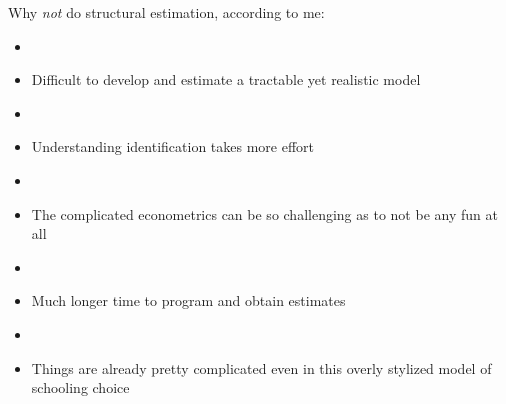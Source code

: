\documentclass[aspectratio=169]{beamer}
\begin{document}
\begin{frame}
Why \textit{not} do structural estimation, according to me:

\begin{itemize}
\item[]
\item Difficult to develop and estimate a tractable yet realistic model
\item[]
\item Understanding identification takes more effort
\item[]
\item The complicated econometrics can be so challenging as to not be any fun at all
\item[]
\item Much longer time to program and obtain estimates
\item[]
\item Things are already pretty complicated even in this overly stylized model of schooling choice
\end{itemize}
\end{frame}
\end{document}
